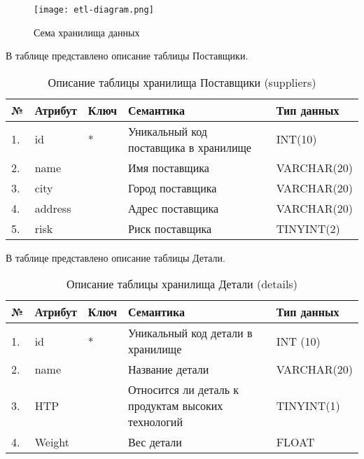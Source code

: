 \begin{figure}[h]
  \centering
  \texttt{[image: etl-diagram.png]}
  \caption{Сема хранилища данных}
  \label{etl-diagram}
\end{figure}

В таблице  представлено описание таблицы Поставщики.
\begin{table}[h]
	\caption{\space Описание таблицы хранилища Поставщики (suppliers)}
	\label{etl-suppliers}
	\begin{tabular}{|p{0.4cm}|p{2.5cm}|p{1.5cm}|p{6.3cm}|p{3.2cm}|}
		\hline
		\textbf{№} & \textbf{Атрибут} & \textbf{Ключ} & \textbf{Семантика} & \textbf{Тип данных} \\
		\hline
		1. & id & * & Уникальный код поставщика в хранилище & INT(10) \\
		\hline
		2. & name & & Имя поставщика & VARCHAR(20) \\
		\hline
		3. & city & & Город поставщика & VARCHAR(20) \\
		\hline
		4. & address & & Адрес поставщика & VARCHAR(20) \\
		\hline
		5. & risk & & Риск поставщика & TINYINT(2) \\
		\hline
	\end{tabular}
\end{table}

В таблице  представлено описание таблицы Детали.
\begin{table}[h]
	\caption{\space Описание таблицы хранилища Детали (details)}
	\label{etl-parts}
	\begin{tabular}{|p{0.4cm}|p{2.5cm}|p{1.5cm}|p{6.3cm}|p{3.2cm}|}
		\hline
		\textbf{№} & \textbf{Атрибут} & \textbf{Ключ} & \textbf{Семантика} & \textbf{Тип данных} \\
		\hline
		1. & id & * & Уникальный код детали в хранилище & INT (10) \\
		\hline
		2. & name & & Название детали & VARCHAR(20) \\
		\hline
		3. & HTP & & Относится ли деталь к продуктам высоких технологий & TINYINT(1) \\
		\hline
		4. & Weight & & Вес детали & FLOAT \\
		\hline
	\end{tabular}
\end{table}

